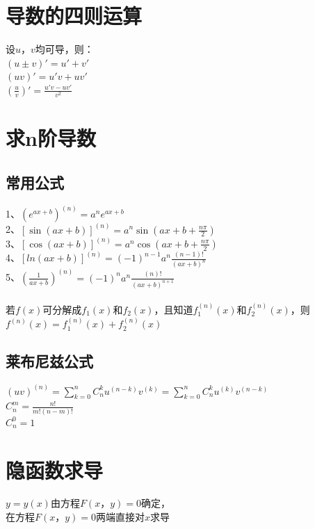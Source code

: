 \documentclass{article}
\begin{document}
\begin{flushleft}
	\section{导数的四则运算}
	
	设$u，v$均可导，则：\\
	$(u\pm v)'=u'+v'$\\
	$(uv)'=u'v+uv'$\\
	$(\frac{u}{v})'=\frac{u'v-uv'}{v^2}$\\
	
	\section{求n阶导数}
	
	\subsection{常用公式}
	
	1、$(e^{ax+b})^{(n)}=a^ne^{ax+b}$\\
	2、$[\sin(ax+b)]^{(n)}=a^n\sin(ax+b+\frac{n\pi}{2})$\\
	3、$[\cos(ax+b)]^{(n)}=a^n\cos(ax+b+\frac{n\pi}{2})$\\
	4、$[ln(ax+b)]^{(n)}=(-1)^{n-1}a^n\frac{(n-1)!}{(ax+b)^n}$\\
	5、$(\frac{1}{ax+b})^{(n)}=(-1)^{n}a^n\frac{(n)!}{(ax+b)^{n+1}}$\\
	~\\
	若$f(x)$可分解成$f_1(x)$和$f_2(x)$，且知道$f_1^{(n)}(x)$和$f_2^{(n)}(x)$，则$f^{(n)}(x)=f_1^{(n)}(x)+f_2^{(n)}(x)$\\

	\subsection{莱布尼兹公式}
	
	$(uv)^{(n)} = \sum\limits_{k=0}^{n} C_n^k u^{(n-k)} v^{(k)} = \sum\limits_{k=0}^{n} C_n^k u^{(k)} v^{(n-k)}$\\
	$C_n^m=\frac{n!}{m!(n-m)!}$\\
	$C_n^0=1$\\
	
	\section{隐函数求导}
	
	$y=y(x)$由方程$F(x，y)=0$确定，\\
	在方程$F(x，y)=0$两端直接对$x$求导\\
	

\end{flushleft}
\end{document}
